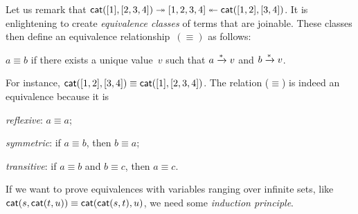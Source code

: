 Let us remark that \(\textsf{cat}([1], [2,3,4]) \twoheadrightarrow
[1,2,3,4] \twoheadleftarrow \textsf{cat}([1,2],
[3,4])\). It is enlightening to create
\emph{equivalence classes} of terms that are joinable. These classes
then define an equivalence relationship~\((\equiv)\)
 as follows:
\begin{center}
  \(a \equiv b\) if there exists a unique value~\(v\) such that \(a
  \xrightarrow{\smash[t]{*}} v\) and \(b \xrightarrow{\smash{*}} v\).
\end{center}
For instance, \(\textsf{cat}([1,2], [3,4]) \equiv \textsf{cat}([1],
[2,3,4])\). The relation (\(\equiv\)) is indeed an equivalence
because it is
\begin{itemize*}

  \item \emph{reflexive}: \(a \equiv a\);

  \item \emph{symmetric}: if \(a \equiv b\), then \(b \equiv a\);

  \item \emph{transitive}: if \(a \equiv b\) and \(b \equiv c\), then
    \(a \equiv c\).

\end{itemize*}

If we want to prove equivalences with variables ranging over
infinite sets, like \(\textsf{cat}(s,\textsf{cat}(t,u)) \equiv
\textsf{cat}(\textsf{cat}(s,t),u)\), we need some
\emph{induction principle}.


\label{par:well-founded}

